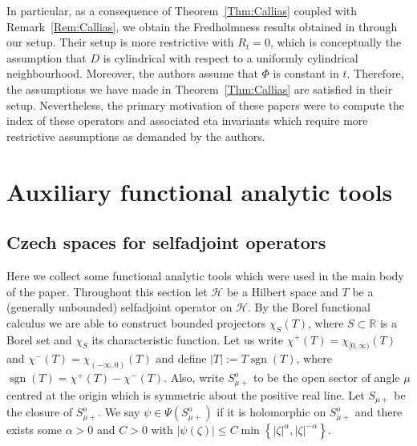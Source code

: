 \documentclass[a4paper,10pt,reqno]{amsart}
\newcommand{\R}{\mathbb{R}}
\newcommand{\dbrac}[1]{\left\{#1\right\}}
\newcommand{\modulus}[1]{|#1|}
\newcommand{\set}[1]{\dbrac{#1}}
\newcommand{\Hil}{\mathscr{H}}
\DeclareMathOperator{\sgn}{sgn}%
\theoremstyle{definition}
\begin{document}
In particular, as a consequence of Theorem~\ref{Thm:Callias} coupled with Remark~\ref{Rem:Callias}, we obtain the Fredholmness results obtained in \cites{BS0, BS1, BS2} through our setup. 
Their setup is more restrictive with $R_t = 0$, which is conceptually the assumption that  $D$ is cylindrical with respect to a uniformly cylindrical neighbourhood. 
Moreover, the authors assume that $\Phi$ is constant in $t$. 
Therefore, the assumptions we have made in Theorem~\ref{Thm:Callias} are satisfied in their setup.
Nevertheless, the primary motivation of these papers were to compute the index of these operators and associated eta invariants which require more restrictive assumptions as demanded by the authors.

\appendix

\section{Auxiliary functional analytic tools}

\subsection{Czech spaces for selfadjoint operators}

Here we collect some functional analytic tools which were used in the main body of the paper.
Throughout this section let $\Hil$ be a Hilbert space and $T$ be a (generally unbounded) selfadjoint operator on $\Hil$.
By the Borel functional calculus we are able to construct bounded projectors $\chi_{S}(T)$, where $S \subset \R$ is a Borel set and $\chi_S$ its characteristic function.
Let us write $\chi^+(T) = \chi_{[0,\infty)}(T)$ and $\chi^-(T) = \chi_{(-\infty, 0)}(T)$ and define $\modulus{T} := T \sgn(T)$, where $\sgn(T) = \chi^+(T) - \chi^{-}(T)$.
Also, write $S_{\mu+}^o$ to be the open sector of angle $\mu$ centred at the origin which is symmetric about the positive real line.
Let $S_{\mu+}$ be the closure of $S_{\mu+}^o$.
We say $\psi \in \Psi(S_{\mu+}^o)$ if it is holomorphic on $S_{\mu+}^o$ and there exists some $\alpha > 0$ and $C > 0$ with $\modulus{\psi(\zeta)} \leq C \min\set{\modulus{\zeta}^\alpha, \modulus{\zeta}^{-\alpha}}$.
\end{document}
